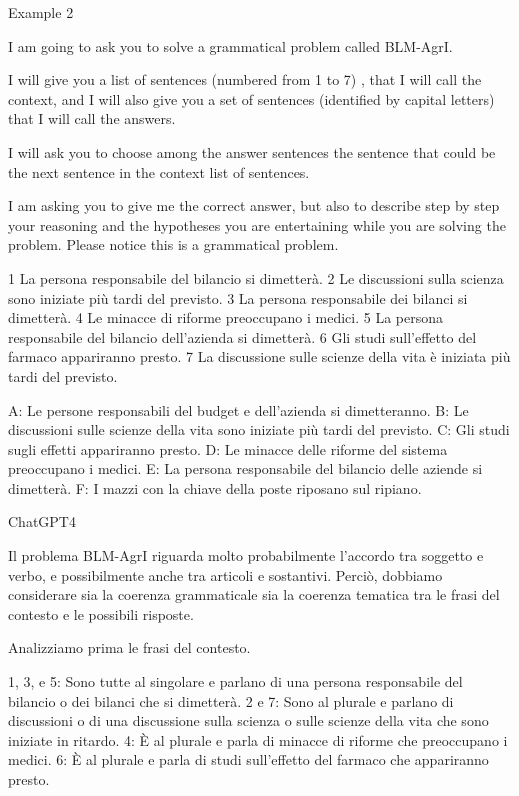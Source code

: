 Example 2

I am going to ask you to solve a grammatical problem called BLM-AgrI.  

I will give you a list of sentences (numbered from 1 to 7) , that I will call the context, and I will also give you a set of sentences (identified by capital letters) that I will call  the answers. 

I will ask you to choose among the answer sentences the sentence that could be the next sentence in the context list of sentences.

I am asking you to give me the correct answer, but also to describe step by step  your reasoning and the hypotheses you are entertaining while you are solving the problem. Please notice this is a grammatical problem.



1 La persona responsabile del bilancio si dimetterà.
2 Le discussioni sulla scienza sono iniziate più tardi del previsto.
3 La persona responsabile dei bilanci si dimetterà.
4 Le minacce di riforme preoccupano i medici.
5 La persona responsabile del bilancio dell'azienda si dimetterà.
6 Gli studi sull'effetto del farmaco appariranno presto.
7 La discussione sulle scienze della vita è iniziata più tardi del previsto.


A: Le persone responsabili del budget e dell'azienda si dimetteranno.
B: Le discussioni sulle scienze della vita sono iniziate più tardi del previsto.
C: Gli studi sugli effetti appariranno presto.
D: Le minacce delle riforme del sistema preoccupano i medici.
E: La persona responsabile del bilancio delle aziende si dimetterà.
F: I mazzi con la chiave della poste riposano sul ripiano.

ChatGPT4

Il problema BLM-AgrI riguarda molto probabilmente l'accordo tra soggetto e verbo, e possibilmente anche tra articoli e sostantivi. Perciò, dobbiamo considerare sia la coerenza grammaticale sia la coerenza tematica tra le frasi del contesto e le possibili risposte.

Analizziamo prima le frasi del contesto.

1, 3, e 5: Sono tutte al singolare e parlano di una persona responsabile del bilancio o dei bilanci che si dimetterà.
2 e 7: Sono al plurale e parlano di discussioni o di una discussione sulla scienza o sulle scienze della vita che sono iniziate in ritardo.
4: È al plurale e parla di minacce di riforme che preoccupano i medici.
6: È al plurale e parla di studi sull'effetto del farmaco che appariranno presto.

